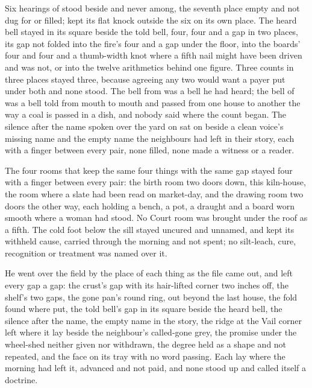 \scenebreak

Six hearings of  stood beside and never among, the seventh place empty and not dug for or filled;  kept its flat knock outside the six on its own place. The heard bell stayed in its square beside the told bell, four, four and a gap in two places, its gap not folded into the fire's four and a gap under the floor, into the boards' four and four and a thumb-width knot where a fifth nail might have been driven and was not, or into the twelve arithmetics behind one figure. Three counts in three places stayed three, because agreeing any two would want a payer put under both and none stood. The bell from  was a bell he had heard; the bell of  was a bell told from mouth to mouth and passed from one house to another the way a coal is passed in a dish, and nobody said where the count began. The silence after the name spoken over the yard on  sat on  beside a clean voice's missing name and the empty name the neighbours had left in their story, each with a finger between every pair, none filled, none made a witness or a reader.

The four rooms that keep the same four things with the same gap stayed four with a finger between every pair: the birth room two doors down, this kiln-house, the room where a slate had been read on market-day, and the drawing room two doors the other way, each holding a bench, a pot, a draught and a board worn smooth where a woman had stood. No Court room was brought under the roof as a fifth. The cold foot below the sill stayed uncured and unnamed, and  kept its withheld cause, carried through the morning and not spent; no silt-leach, cure, recognition or treatment was named over it.

He went over the field by the place of each thing as the file came out, and left every gap a gap: the crust's gap with its hair-lifted corner two inches off, the shelf's two gaps, the gone pan's round ring,  out beyond the last house, the fold found where put, the told bell's gap in its square beside the heard bell, the silence after the name, the empty name in the story, the ridge at the Vail corner left where it lay beside the neighbour's called-gone grey, the promise under the wheel-shed neither given nor withdrawn, the degree held as a shape and not repeated, and the face on its tray with no word passing. Each lay where the morning had left it, advanced and not paid, and none stood up and called itself a doctrine.

